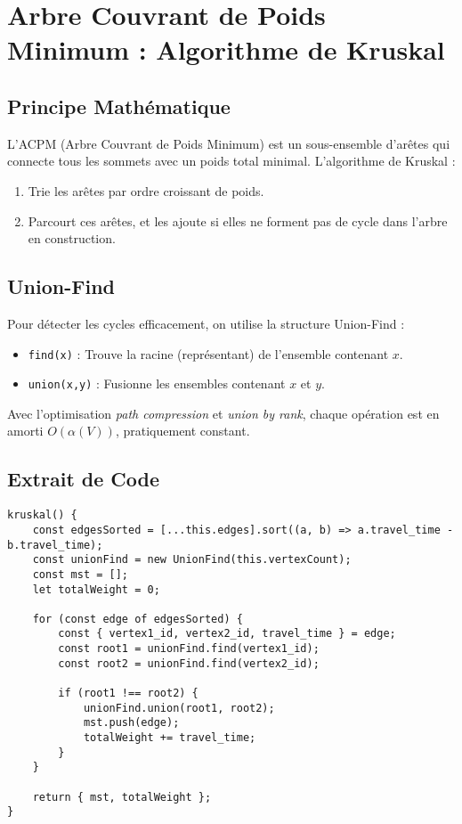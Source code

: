 \documentclass[a4paper,12pt]{article}
\begin{document}
\section{Arbre Couvrant de Poids Minimum : Algorithme de Kruskal}

\subsection{Principe Mathématique}

L’ACPM (Arbre Couvrant de Poids Minimum) est un sous-ensemble d’arêtes qui connecte tous les sommets avec un poids total minimal. L’algorithme de Kruskal :
\begin{enumerate}
    \item Trie les arêtes par ordre croissant de poids.
    \item Parcourt ces arêtes, et les ajoute si elles ne forment pas de cycle dans l’arbre en construction.
\end{enumerate}


\subsection{Union-Find}

Pour détecter les cycles efficacement, on utilise la structure Union-Find :
\begin{itemize}
    \item \texttt{find(x)} : Trouve la racine (représentant) de l’ensemble contenant $x$.
    \item \texttt{union(x,y)} : Fusionne les ensembles contenant $x$ et $y$.
\end{itemize}

Avec l’optimisation \emph{path compression} et \emph{union by rank}, chaque opération est en amorti $O(\alpha(V))$, pratiquement constant.

\subsection{Extrait de Code}

\begin{verbatim}
kruskal() {
    const edgesSorted = [...this.edges].sort((a, b) => a.travel_time - b.travel_time);
    const unionFind = new UnionFind(this.vertexCount);
    const mst = [];
    let totalWeight = 0;

    for (const edge of edgesSorted) {
        const { vertex1_id, vertex2_id, travel_time } = edge;
        const root1 = unionFind.find(vertex1_id);
        const root2 = unionFind.find(vertex2_id);

        if (root1 !== root2) {
            unionFind.union(root1, root2);
            mst.push(edge);
            totalWeight += travel_time;
        }
    }

    return { mst, totalWeight };
}
\end{verbatim}
\end{document}
